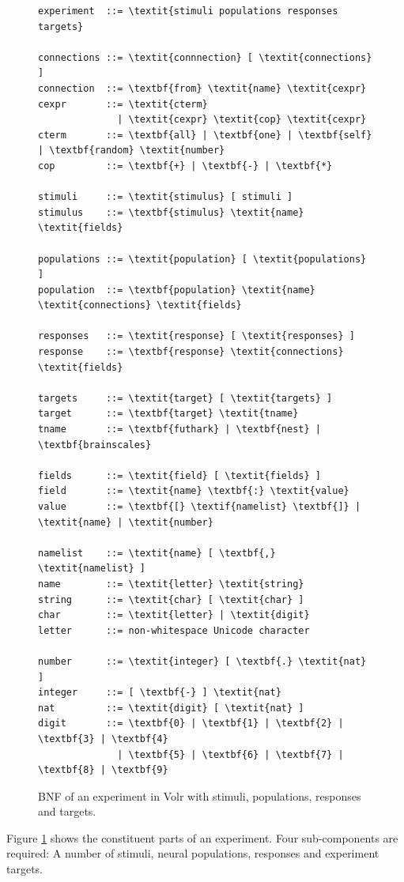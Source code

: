\begin{figure}
  \begin{Verbatim}[commandchars=\\\{\}]
experiment  ::= \textit{stimuli populations responses targets}

connections ::= \textit{connnection} [ \textit{connections} ]
connection  ::= \textbf{from} \textit{name} \textit{cexpr}
cexpr       ::= \textit{cterm}
              | \textit{cexpr} \textit{cop} \textit{cexpr}
cterm       ::= \textbf{all} | \textbf{one} | \textbf{self} | \textbf{random} \textit{number}
cop         ::= \textbf{+} | \textbf{-} | \textbf{*}

stimuli     ::= \textit{stimulus} [ stimuli ]
stimulus    ::= \textbf{stimulus} \textit{name} \textit{fields}

populations ::= \textit{population} [ \textit{populations} ]
population  ::= \textbf{population} \textit{name} \textit{connections} \textit{fields}

responses   ::= \textit{response} [ \textit{responses} ]
response    ::= \textbf{response} \textit{connections} \textit{fields}

targets     ::= \textit{target} [ \textit{targets} ]
target      ::= \textbf{target} \textit{tname}
tname       ::= \textbf{futhark} | \textbf{nest} | \textbf{brainscales}

fields      ::= \textit{field} [ \textit{fields} ]
field       ::= \textit{name} \textbf{:} \textit{value}
value       ::= \textbf{[} \textif{namelist} \textbf{]} | \textit{name} | \textit{number}

namelist    ::= \textit{name} [ \textbf{,} \textit{namelist} ]
name        ::= \textit{letter} \textit{string}
string      ::= \textit{char} [ \textit{char} ]
char        ::= \textit{letter} | \textit{digit}
letter      ::= non-whitespace Unicode character

number      ::= \textit{integer} [ \textbf{.} \textit{nat} ]
integer     ::= [ \textbf{-} ] \textit{nat}
nat         ::= \textit{digit} [ \textit{nat} ]
digit       ::= \textbf{0} | \textbf{1} | \textbf{2} | \textbf{3} | \textbf{4}
              | \textbf{5} | \textbf{6} | \textbf{7} | \textbf{8} | \textbf{9}

  \end{Verbatim}
  \caption{BNF of an experiment in Volr with stimuli, populations, responses and
           targets.}
  \label{fig:volr-bnf}
\end{figure}

Figure \ref{fig:volr-bnf} shows the constituent parts of an experiment.
Four sub-com\-po\-nents are required:
  A number of stimuli, neural populations, responses and experiment targets.

